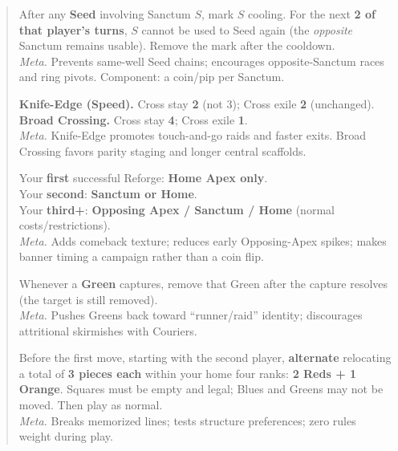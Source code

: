 \documentclass[11pt]{article}
\begin{document}
\begin{quote}
\begin{rulevariant}[title={Sanctum Cooldown (Well Goes Dry)}]
After any \textbf{Seed} involving Sanctum $S$, mark $S$ cooling. For the next \textbf{2 of that player’s turns}, $S$ cannot be used to Seed again (the \emph{opposite} Sanctum remains usable). Remove the mark after the cooldown.\\
\textit{Meta.} Prevents same-well Seed chains; encourages opposite-Sanctum races and ring pivots. Component: a coin/pip per Sanctum.
\end{rulevariant}

\begin{rulevariant}[title={Cross Knife-Edge / Broad Crossing (CF Timers)}]
\textbf{Knife-Edge (Speed).} Cross stay \textbf{2} (not 3); Cross exile \textbf{2} (unchanged).\\
\textbf{Broad Crossing.} Cross stay \textbf{4}; Cross exile \textbf{1}.\\
\textit{Meta.} Knife-Edge promotes touch-and-go raids and faster exits. Broad Crossing favors parity staging and longer central scaffolds.
\end{rulevariant}

\begin{rulevariant}[title={Reforge Ladder (Placement Unlocks)}]
Your \textbf{first} successful Reforge: \textbf{Home Apex only}.\\
Your \textbf{second}: \textbf{Sanctum or Home}.\\
Your \textbf{third+}: \textbf{Opposing Apex / Sanctum / Home} (normal costs/restrictions).\\
\textit{Meta.} Adds comeback texture; reduces early Opposing-Apex spikes; makes banner timing a campaign rather than a coin flip.
\end{rulevariant}

\begin{rulevariant}[title={Spent Courier (Greens Trade Themselves)}]
Whenever a \textbf{Green} captures, remove that Green after the capture resolves (the target is still removed).\\
\textit{Meta.} Pushes Greens back toward “runner/raid” identity; discourages attritional skirmishes with Couriers.
\end{rulevariant}

\begin{rulevariant}[title={Opening Draft (Set-Piece Tuning)}]
Before the first move, starting with the second player, \textbf{alternate} relocating a total of \textbf{3 pieces each} within your home four ranks: \textbf{2 Reds + 1 Orange}. Squares must be empty and legal; Blues and Greens may not be moved. Then play as normal.\\
\textit{Meta.} Breaks memorized lines; tests structure preferences; zero rules weight during play.
\end{rulevariant}


\end{quote}
\end{document}
